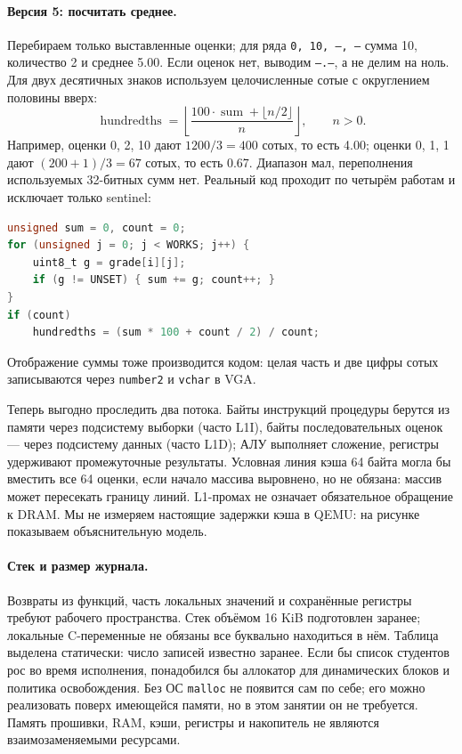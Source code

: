 \paragraph{Версия 5: посчитать среднее.}
Перебираем только выставленные оценки; для ряда \texttt{0, 10, --, --}
сумма 10, количество 2 и среднее 5.00. Если оценок нет, выводим
\texttt{--.--}, а не делим на ноль. Для двух десятичных знаков используем
целочисленные сотые с округлением половины вверх:
\[
\operatorname{hundredths}
=\left\lfloor\frac{100\cdot\operatorname{sum}+\lfloor n/2\rfloor}{n}\right\rfloor,
\qquad n>0.
\]
Например, оценки 0, 2, 10 дают $1200/3=400$ сотых, то есть 4.00;
оценки 0, 1, 1 дают $(200+1)/3=67$ сотых, то есть 0.67.
Диапазон мал, переполнения используемых 32-битных сумм нет.
Реальный код проходит по четырём работам и исключает только sentinel:
\begin{lstlisting}[language=C,basicstyle=\ttfamily\small]
unsigned sum = 0, count = 0;
for (unsigned j = 0; j < WORKS; j++) {
    uint8_t g = grade[i][j];
    if (g != UNSET) { sum += g; count++; }
}
if (count)
    hundredths = (sum * 100 + count / 2) / count;
\end{lstlisting}
Отображение суммы тоже производится кодом: целая часть и две цифры сотых
записываются через \texttt{number2} и \texttt{vchar} в VGA.

Теперь выгодно проследить два потока. Байты инструкций процедуры берутся
из памяти через подсистему выборки (часто L1I), байты последовательных
оценок --- через подсистему данных (часто L1D); АЛУ выполняет сложение,
регистры удерживают промежуточные результаты. Условная линия кэша
64 байта могла бы вместить все 64 оценки, если начало массива выровнено,
но не обязана: массив может пересекать границу линий. L1-промах не означает
обязательное обращение к DRAM. Мы не измеряем настоящие задержки кэша
в QEMU: на рисунке показываем объяснительную модель.

\paragraph{Стек и размер журнала.}
Возвраты из функций, часть локальных значений и сохранённые регистры
требуют рабочего пространства. Стек объёмом 16 KiB подготовлен заранее;
локальные C-переменные не обязаны все буквально находиться в нём.
Таблица выделена статически: число записей известно заранее.
Если бы список студентов рос во время исполнения, понадобился бы
аллокатор для динамических блоков и политика освобождения. Без ОС
\texttt{malloc} не появится сам по себе; его можно реализовать поверх
имеющейся памяти, но в этом занятии он не требуется. Память прошивки,
RAM, кэши, регистры и накопитель не являются взаимозаменяемыми ресурсами.

